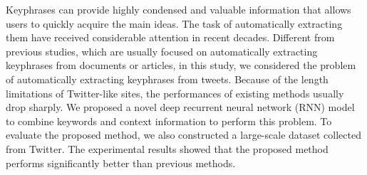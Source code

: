 Keyphrases can provide highly condensed and valuable information that allows users to quickly acquire the main ideas. The task of automatically extracting them have received considerable attention in recent decades. Different from previous studies, which are usually focused on automatically extracting keyphrases from documents or articles, in this study, we considered the problem of automatically extracting keyphrases from tweets. Because of the length limitations of Twitter-like sites, the performances of existing methods usually drop sharply.  We proposed a novel deep recurrent neural network (RNN) model to combine keywords and context information to perform this problem. To evaluate the proposed method, we also constructed a large-scale dataset collected from Twitter. The experimental results showed that the proposed method performs significantly better than previous methods.

